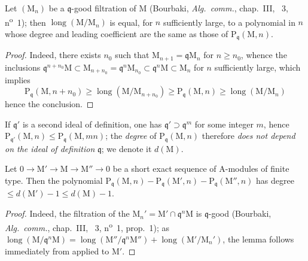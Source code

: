 
\begin{lemma}[16.2.2.1]
\label{0.16.2.2.1}
Let $(\mathrm{M}_n)$ be a $\mathfrak{q}$-good filtration of $\mathrm{M}$ (Bourbaki, \emph{Alg.~comm.}, chap.~III, \textsection~3, n\textsuperscript{o}~1); then $\operatorname{long}(\mathrm{M}/\mathrm{M}_n)$ is equal, for $n$ sufficiently large, to a polynomial in $n$ whose degree and leading coefficient are the same as those of $\mathrm{P}_\mathfrak{q}(\mathrm{M},n)$.
\end{lemma}

\begin{proof}
Indeed, there exists $n_0$ such that $\mathrm{M}_{n+1}=\mathfrak{q}\mathrm{M}_n$ for $n\geq n_0$, whence the inclusions $\mathfrak{q}^{n+n_0}\mathrm{M}\subset\mathrm{M}_{n+n_0}=\mathfrak{q}^n\mathrm{M}_{n_0}\subset\mathfrak{q}^n\mathrm{M}\subset\mathrm{M}_n$ for $n$ sufficiently large, which implies
\[
  \mathrm{P}_\mathfrak{q}(\mathrm{M},n+n_0)\geq\operatorname{long}(\mathrm{M}/\mathrm{M}_{n+n_0})\geq\mathrm{P}_\mathfrak{q}(\mathrm{M},n)\geq\operatorname{long}(\mathrm{M}/\mathrm{M}_n)
\]
hence the conclusion.
\end{proof}

If $\mathfrak{q}'$ is a second ideal of definition, one has $\mathfrak{q}'\supset\mathfrak{q}^m$ for some integer $m$, hence $\mathrm{P}_{\mathfrak{q}'}(\mathrm{M},n)\leq\mathrm{P}_\mathfrak{q}(\mathrm{M},mn)$; the \emph{degree} of $\mathrm{P}_\mathfrak{q}(\mathrm{M},n)$ therefore \emph{does not depend on the ideal of definition} $\mathfrak{q}$; we denote it $d(\mathrm{M})$.

\begin{lemma}[16.2.2.2]
\label{0.16.2.2.2}
Let $0\to\mathrm{M}'\to\mathrm{M}\to\mathrm{M}''\to 0$ be a short exact sequence of $\mathrm{A}$-modules of finite type.
Then the polynomial $\mathrm{P}_\mathfrak{q}(\mathrm{M},n)-\mathrm{P}_\mathfrak{q}(\mathrm{M}',n)-\mathrm{P}_\mathfrak{q}(\mathrm{M}'',n)$ has degree $\leq d(\mathrm{M}')-1\leq d(\mathrm{M})-1$.
\end{lemma}

\begin{proof}
Indeed, the filtration of the $\mathrm{M}_n'=\mathrm{M}'\cap\mathfrak{q}^n\mathrm{M}$ is $\mathfrak{q}$-good (Bourbaki, \emph{Alg.~comm.}, chap.~III, \textsection~3, n\textsuperscript{o}~1, prop.~1); as $\operatorname{long}(\mathrm{M}/\mathfrak{q}^n\mathrm{M})=\operatorname{long}(\mathrm{M}''/\mathfrak{q}^n\mathrm{M}'')+\operatorname{long}(\mathrm{M}'/\mathrm{M}_n')$, the lemma follows immediately from  applied to $\mathrm{M}'$.
\end{proof}

